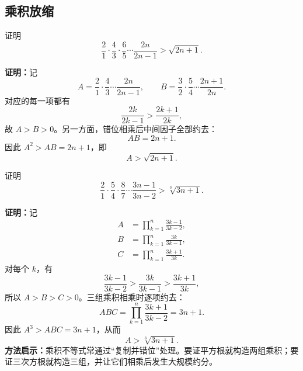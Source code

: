 \subsection{乘积放缩}

\begin{examplebox}
  证明
  \[
    \frac21\cdot\frac43\cdot\frac65\cdots\frac{2n}{2n-1}
      >\sqrt{2n+1}.
  \]

  \textbf{证明：}记
  \[
    A=\frac21\cdot\frac43\cdots\frac{2n}{2n-1},
    \qquad
    B=\frac32\cdot\frac54\cdots\frac{2n+1}{2n}.
  \]
  对应的每一项都有
  \[
    \frac{2k}{2k-1}>\frac{2k+1}{2k},
  \]
  故 $A>B>0$。另一方面，错位相乘后中间因子全部约去：
  \[
    AB=2n+1.
  \]
  因此 $A^2>AB=2n+1$，即
  \[
    \boxed{A>\sqrt{2n+1}}.
  \]
\end{examplebox}

\begin{examplebox}
  证明
  \[
    \frac21\cdot\frac54\cdot\frac87\cdots
      \frac{3n-1}{3n-2}>\sqrt[3]{3n+1}.
  \]

  \textbf{证明：}记
  \begin{align*}
    A&=\prod_{k=1}^{n}\frac{3k-1}{3k-2},\\
    B&=\prod_{k=1}^{n}\frac{3k}{3k-1},\\
    C&=\prod_{k=1}^{n}\frac{3k+1}{3k}.
  \end{align*}
  对每个 $k$，有
  \[
    \frac{3k-1}{3k-2}>\frac{3k}{3k-1}>\frac{3k+1}{3k},
  \]
  所以 $A>B>C>0$。三组乘积相乘时逐项约去：
  \[
    ABC=\prod_{k=1}^{n}\frac{3k+1}{3k-2}=3n+1.
  \]
  因此 $A^3>ABC=3n+1$，从而
  \[
    \boxed{A>\sqrt[3]{3n+1}}.
  \]
  \textbf{方法启示：}乘积不等式常通过“复制并错位”处理。要证平方根就构造两组乘积；要证三次方根就构造三组，并让它们相乘后发生大规模约分。
\end{examplebox}

